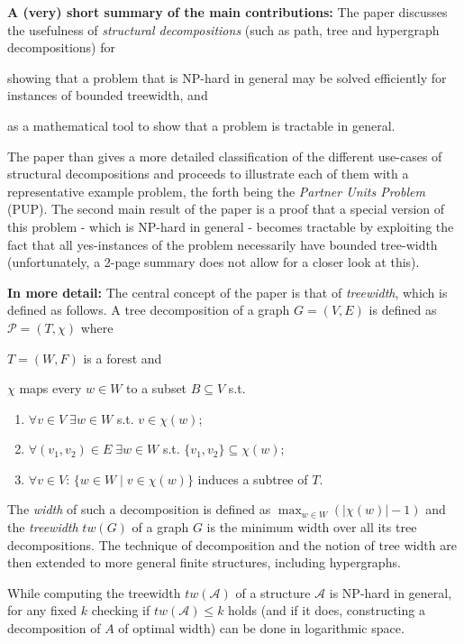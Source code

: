 \documentclass [11pt]{article}
\begin{document}
\pagebreak
\textbf{A (very) short summary of the main contributions:}
The paper discusses the usefulness of \emph{structural decompositions} (such as path, tree and hypergraph decompositions) for
\begin{inparaenum}
 \item showing that a problem that is NP-hard in general may be solved efficiently for instances of bounded treewidth, and
 \item as a mathematical tool to show that a problem is tractable in general.
\end{inparaenum}
The paper than gives a more detailed classification of the different use-cases of structural decompositions and proceeds to illustrate each of them with a representative example problem, the forth being the \emph{Partner Units Problem} (PUP). 
The second main result of the paper is a proof that a special version of this problem - which is NP-hard in general - becomes tractable by exploiting the fact that all yes-instances of the problem necessarily have bounded tree-width (unfortunately, a 2-page summary does not allow for a closer look at this).

\bigskip
\textbf{In more detail:}
The central concept of the paper is that of \emph{treewidth}, which is defined as follows. 
A tree decomposition of a graph $G=(V,E)$ is defined as $\mathcal{P} =(T, \chi)$ where
\begin{inparaenum}[ a) \upshape]
 \item $T = (W,F)$ is a forest and
 \item $\chi$ maps every $w \in W$ to a subset $B\subseteq V$ s.t.
\end{inparaenum}
\begin{enumerate}[ a) \upshape]
 \item $\forall v \in V \; \exists w \in W$ s.t. $v \in \chi(w)$;
 \item $\forall (v_1, v_2) \in E \; \exists w\in W$ s.t. $\{v_1, v_2\} \subseteq \chi(w)$;
 \item $\forall v\in V$: $\{w\in W \; | \; v \in \chi(w) \}$ induces a subtree of $T$.
\end{enumerate}
The \emph{width} of such a decomposition is defined as $\max_{w\in W}(|\chi(w)| - 1)$ and the \emph{treewidth} $tw(G)$ of a graph $G$ is the minimum width over all its tree decompositions.
The technique of decomposition and the notion of tree width are then extended to more general finite structures, including hypergraphs. 

While computing the treewidth $tw(\mathcal{A})$ of a structure $\mathcal{A}$ is NP-hard in general, for any fixed $k$ checking if $tw(\mathcal{A}) \leq k$ holds (and if it does, constructing a decomposition of $A$ of optimal width) can be done in logarithmic space.
\end{document}
